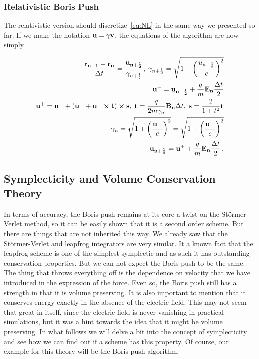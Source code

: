 \documentclass[12pt, class=report, crop=false]{standalone}
\begin{document}
\subsubsection{Relativistic Boris Push}

The relativistic version should discretize~\cref{eq:NL} in the same way we presented so far. If we make the notation \(\vb{u} = \gamma \vb{v}\), the equations of the algorithm are now simply

\begin{subequations}
  \begin{align}
    \frac{\vb{r_{n+1}} - \vb{r_n}}{\Delta t} = \frac{\vb{u_{n+\frac{1}{2}}}}{\gamma_{n+\frac{1}{2}}},\; \gamma_{n+\frac{1}{2}} =
    \sqrt{1+\left(\frac{u_{n+\frac{1}{2}}}{c}\right)^2}\\
    \vb{u^-} = \vb{u_{n-\frac{1}{2}}} + \frac{q}{m} \vb{E_n} \frac{\Delta t}{2}\\
    \vb{u^+} = \vb{u^-} + (\vb{u^-} + \vb{u^-} \cp \vb{t}) \cp \vb{s},\;
    \vb{t} = \frac{q}{2m \gamma_n} \vb{B_n} \Delta t,\; \vb{s} = \frac{2}{1+t^2} \vb{t}\\
    \gamma_n = \sqrt{1+\left(\frac{\vb{u}^-}{c}\right)^2} = \sqrt{1+\left(\frac{\vb{u}^+}{c}\right)^2}\\
    \vb{u_{n+\frac{1}{2}}} = \vb{u^+} + \frac{q}{m} \vb{E_n} \frac{\Delta t}{2}\,.
  \end{align}
\end{subequations}

\subsection{Symplecticity and Volume Conservation Theory}

In terms of accuracy, the Boris push remains at its core a twist on the Störmer-Verlet method, so it can be easily shown that it is a second order scheme. But there are things that are not inherited this way. We already saw that the Störmer-Verlet and leapfrog integrators are very similar. It a known fact that the leapfrog scheme is one of the simplest symplectic and as such it has outstanding conservation properties. But we can not expect the Boris push to be the same. The thing that throws everything off is the dependence on velocity that we have introduced in the expression of the force. Even so, the Boris push still has a strength in that it is volume preserving. It is also important to mention that it conserves energy exactly in the absence of the electric field. This may not seem that great in itself, since the electric field is never vanishing in practical simulations, but it was a hint towards the idea that it might be volume preserving. In what follows we will delve a bit into the concept of symplecticity and see how we can find out if a scheme has this property. Of course, our example for this theory will be the Boris push algorithm.
\end{document}
